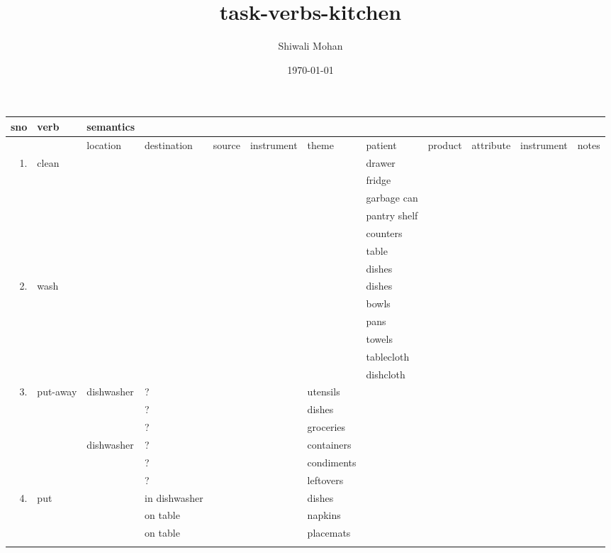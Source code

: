 \documentclass[11pt]{article}
\author{Shiwali Mohan}
\date{\today}
\title{task-verbs-kitchen}
\begin{document}
\maketitle
\tableofcontents

\begin{center}
\begin{tabular}{r|l|llllllllll|}
\hline
sno & verb & semantics &  &  &  &  &  &  &  &  & \\
\hline
 &  & location & destination & source & instrument & theme & patient & product & attribute & instrument & notes\\
\hline
1. & clean &  &  &  &  &  & drawer &  &  &  & \\
 &  &  &  &  &  &  & fridge &  &  &  & \\
 &  &  &  &  &  &  & garbage can &  &  &  & \\
 &  &  &  &  &  &  & pantry shelf &  &  &  & \\
 &  &  &  &  &  &  & counters &  &  &  & \\
 &  &  &  &  &  &  & table &  &  &  & \\
 &  &  &  &  &  &  & dishes &  &  &  & \\
\hline
2. & wash &  &  &  &  &  & dishes &  &  &  & \\
 &  &  &  &  &  &  & bowls &  &  &  & \\
 &  &  &  &  &  &  & pans &  &  &  & \\
 &  &  &  &  &  &  & towels &  &  &  & \\
 &  &  &  &  &  &  & tablecloth &  &  &  & \\
 &  &  &  &  &  &  & dishcloth &  &  &  & \\
\hline
3. & put-away & dishwasher & ? &  &  & utensils &  &  &  &  & \\
 &  &  & ? &  &  & dishes &  &  &  &  & \\
 &  &  & ? &  &  & groceries &  &  &  &  & \\
 &  & dishwasher & ? &  &  & containers &  &  &  &  & \\
 &  &  & ? &  &  & condiments &  &  &  &  & \\
 &  &  & ? &  &  & leftovers &  &  &  &  & \\
\hline
4. & put &  & in dishwasher &  &  & dishes &  &  &  &  & \\
 &  &  & on table &  &  & napkins &  &  &  &  & \\
 &  &  & on table &  &  & placemats &  &  &  &  & \\
 &  &  &  &  &  &  &  &  &  &  & \\

\end{tabular}
\end{center}
\end{document}
